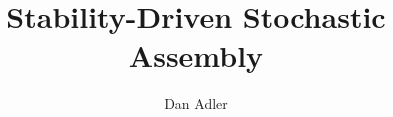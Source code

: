 \documentclass[preprint,12pt]{elsarticle}
\begin{document}
\begin{frontmatter}



\title{Stability-Driven Stochastic Assembly}


\author{Dan Adler} %



\end{frontmatter}
\end{document}
